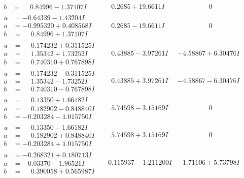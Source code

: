 \documentclass[1p]{elsarticle_modified}
\theoremstyle{definition}
\begin{document}
$$\begin{array}{c|c|c}
\begin{aligned}
b &= \phantom{-}0.84996 - 1.37107 I\end{aligned}
 & \phantom{-}0.2685 + 19.6611 I & \phantom{-0.000000 } 0 \\ \hline\begin{aligned}
u &= -0.64339 - 1.43204 I \\
a &= -0.995320 + 0.408568 I \\
b &= \phantom{-}0.84996 + 1.37107 I\end{aligned}
 & \phantom{-}0.2685 - 19.6611 I & \phantom{-0.000000 } 0 \\ \hline\begin{aligned}
u &= \phantom{-}0.174232 + 0.311525 I \\
a &= \phantom{-}1.35342 + 1.73252 I \\
b &= \phantom{-}0.740310 + 0.767898 I\end{aligned}
 & \phantom{-}0.43885 - 3.97261 I & -4.58867 + 6.30476 I \\ \hline\begin{aligned}
u &= \phantom{-}0.174232 - 0.311525 I \\
a &= \phantom{-}1.35342 - 1.73252 I \\
b &= \phantom{-}0.740310 - 0.767898 I\end{aligned}
 & \phantom{-}0.43885 + 3.97261 I & -4.58867 - 6.30476 I \\ \hline\begin{aligned}
u &= \phantom{-}0.13350 + 1.66182 I \\
a &= \phantom{-}0.182902 - 0.848840 I \\
b &= -0.203284 - 1.015750 I\end{aligned}
 & \phantom{-}5.74598 - 3.15169 I & \phantom{-0.000000 } 0 \\ \hline\begin{aligned}
u &= \phantom{-}0.13350 - 1.66182 I \\
a &= \phantom{-}0.182902 + 0.848840 I \\
b &= -0.203284 + 1.015750 I\end{aligned}
 & \phantom{-}5.74598 + 3.15169 I & \phantom{-0.000000 } 0 \\ \hline\begin{aligned}
u &= -0.268321 + 0.180713 I \\
a &= -0.03370 - 1.96521 I \\
b &= \phantom{-}0.390058 + 0.565987 I\end{aligned}
 & -0.115937 - 1.211200 I & -1.71106 + 5.73798 I \\ \hline\begin{aligned}

\end{aligned}
\end{array}$$
\end{document}
